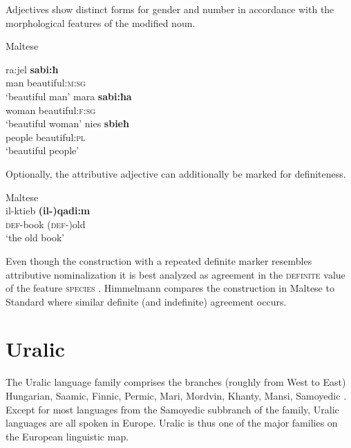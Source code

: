 Adjectives show distinct forms for gender and number in accordance with the morphological features of the modified noun.
\begin{exe}
\ex \rm{Maltese \citep[328]{aquilina1959}}
\begin{xlist}
\ex
\gll	ra:jel \textbf{sabi:ħ}\\
	man beautiful:\textsc{m:sg}\\
\glt	‘beautiful man’
\ex
\gll	mara \textbf{sabi:ħa}\\
	woman beautiful:\textsc{f:sg}\\
\glt	‘beautiful woman’
\ex
\gll	nies \textbf{sbieħ}\\
	people beautiful:\textsc{pl}\\
\glt	‘beautiful people’
\end{xlist}
\end{exe}
Optionally, the attributive adjective can additionally be marked for definiteness.
\begin{exe}
\ex \rm{Maltese \citep[330]{aquilina1959}}\\
\gll	il-ktieb \textbf{(il-)qadi:m}\\
	\textsc{def}-book	(\textsc{def-})old\\
\glt	‘the old book’
\end{exe}
Even though the construction with a repeated definite marker resembles attributive nominalization it is best analyzed as agreement in the \textsc{definite} value of the feature \textsc{species} \citep[179]{himmelmann1997}. Himmelmann compares the construction in Maltese to Standard  where similar definite (and indefinite) agreement occurs.
				
\section{Uralic}\label{uralic synchr}
The Uralic language family comprises the branches (roughly from West to East) Hungarian, Saamic, Finnic, Permic, Mari, Mordvin, Khanty, Mansi, Samoyedic \cite[216–218]{salminen2007}. Except for most languages from the Samoyedic subbranch of the family, Uralic languages are all spoken in Europe. Uralic is thus one of the major families on the European linguistic map.

